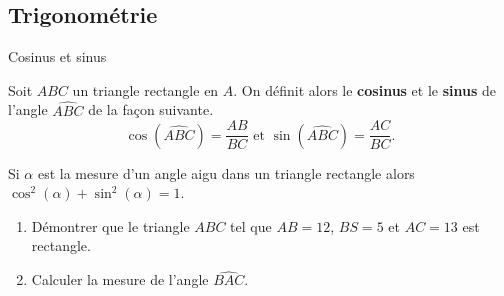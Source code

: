\documentclass[11pt]{article}
\begin{document}
\subsection{Trigonométrie}
\begin{defi}{Cosinus et sinus}
  \begin{minipage}{.7\textwidth}
  Soit $ABC$ un triangle rectangle en $A$. On définit alors le \textbf{cosinus}
  et le \textbf{sinus} de l'angle $\widehat{ABC}$ de la façon suivante.
  \[
    \cos(\widehat{ABC})=\frac{AB}{BC}\text{ et }\sin(\widehat{ABC}) =
    \frac{AC}{BC}.
  \]
\end{minipage}
  \begin{minipage}{.3\textwidth}
\begin{center}
\end{center}
  \end{minipage}
\end{defi}

\begin{prop}
  Si $\alpha$ est la mesure d'un angle aigu dans un triangle rectangle alors
  $\cos^2(\alpha)+\sin^2(\alpha)=1$.
\end{prop}

\begin{app}
  \begin{enumerate}
    \item Démontrer que le triangle $ABC$ tel que $AB=12$, $BS=5$ et $AC=13$ est
      rectangle.
    \item Calculer la mesure de l'angle $\widehat{BAC}$.
  \end{enumerate}
\end{app}
\end{document}
